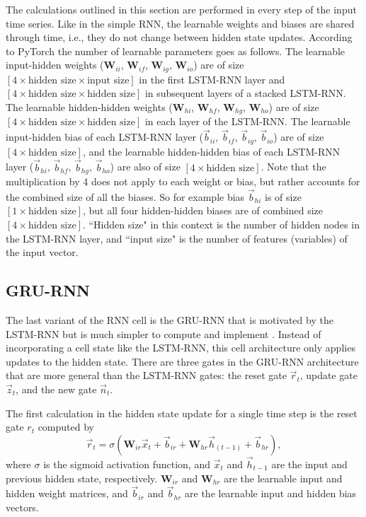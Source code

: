The calculations outlined in this section are performed in every step of the input time series. Like in the simple \ac{RNN}, the learnable weights and biases are shared through time, i.e., they do not change between hidden state updates. According to PyTorch \cite{PyTorch} the number of learnable parameters goes as follows. The learnable input-hidden weights ($\textbf{W}_{ii}$, $\textbf{W}_{if}$, $\textbf{W}_{ig}$, $\textbf{W}_{io}$) are of size $\left[\text{4} \times \text{hidden size} \times \text{input size}\right]$ in the first \ac{LSTM-RNN} layer and $\left[\text{4} \times \text{hidden size} \times \text{hidden size}\right]$ in subsequent layers of a stacked \ac{LSTM-RNN}. The learnable hidden-hidden weights ($\textbf{W}_{hi}$, $\textbf{W}_{hf}$, $\textbf{W}_{hg}$, $\textbf{W}_{ho}$) are of size $\left[4 \times \text{hidden size} \times \text{hidden size}\right]$ in each layer of the \ac{LSTM-RNN}. The learnable input-hidden bias of each \ac{LSTM-RNN} layer ($\vec{b}_{ii}$, $\vec{b}_{if}$, $\vec{b}_{ig}$, $\vec{b}_{io}$) are of size $\left[4 \times \text{hidden size}\right]$, and the learnable hidden-hidden bias of each \ac{LSTM-RNN} layer ($\vec{b}_{hi}$, $\vec{b}_{hf}$, $\vec{b}_{hg}$, $\vec{b}_{ho}$) are also of size $\left[4 \times \text{hidden size}\right]$. Note that the multiplication by 4 does not apply to each weight or bias, but rather accounts for the combined size of all the biases. So for example bias $\vec{b}_{hi}$ is of size $\left[\text{1} \times \text{hidden size}\right]$, but all four hidden-hidden biases are of combined size $\left[4 \times \text{hidden size}\right]$. ``Hidden size" in this context is the number of hidden nodes in the \ac{LSTM-RNN} layer, and ``input size" is the number of features (variables) of the input vector.

\subsection{GRU-RNN}
The last variant of the \ac{RNN} cell is the \ac{GRU-RNN} that is motivated by the \ac{LSTM-RNN} but is much simpler to compute and implement \cite{GRU_original}. Instead of incorporating a cell state like the \ac{LSTM-RNN}, this cell architecture only applies updates to the hidden state. There are three gates in the \ac{GRU-RNN} architecture that are more general than the \ac{LSTM-RNN} gates: the reset gate $\vec{r}_{t}$, update gate $\vec{z}_{t}$, and the new gate $\vec{n}_{t}$.

The first calculation in the hidden state update for a single time step is the reset gate $r_{t}$ computed by
\begin{equation} \label{eq:GRU_reset_gate}
	\vec{r}_{t} = \sigma\left(\textbf{W}_{ir} \vec{x}_{t} + \vec{b}_{ir} + \textbf{W}_{hr} \vec{h}_{\left(t-1\right)} + \vec{b}_{hr}\right),
\end{equation}
where $\sigma$ is the sigmoid activation function, and $\vec{x}_{t}$ and $\vec{h}_{t-1}$ are the input and previous hidden state, respectively. $\textbf{W}_{ir}$ and $\textbf{W}_{hr}$ are the learnable input and hidden weight matrices, and $\vec{b}_{ir}$ and $\vec{b}_{hr}$ are the learnable input and hidden bias vectors.

